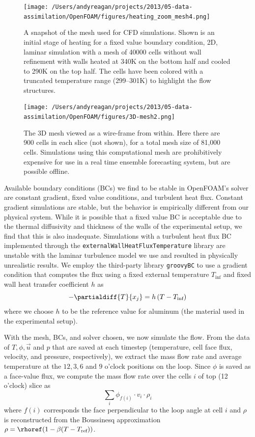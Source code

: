 \begin{figure}[h]
  \centering
  \texttt{[image: /Users/andyreagan/projects/2013/05-data-assimilation/OpenFOAM/figures/heating\_zoom\_mesh4.png]}
  \caption[A snapshot of the mesh used for CFD simulations]{
    A snapshot of the mesh used for CFD simulations.
    Shown is an initial stage of heating for a fixed value boundary condition, 2D, laminar simulation with a mesh of 40000 cells without wall refinement with walls heated at 340K on the bottom half and cooled to 290K on the top half.
    The cells have been colored with a truncated temperature range (299--301K) to highlight the flow structures.
  }
  \label{fig:CFDmesh1}
\end{figure}

\begin{figure}[h]
  \centering
  \texttt{[image: /Users/andyreagan/projects/2013/05-data-assimilation/OpenFOAM/figures/3D-mesh2.png]}
  \caption[The 3D mesh viewed as a wire-frame from within]{
    The 3D mesh viewed as a wire-frame from within.
    Here there are 900 cells in each slice (not shown), for a total mesh size of 81,000 cells.
    Simulations using this computational mesh are prohibitively expensive for use in a real time ensemble forecasting system, but are possible offline.
  }
  \label{fig:CFDmesh2}
\end{figure}

Available boundary conditions (BCs) we find to be stable in OpenFOAM's solver are constant gradient, fixed value conditions, and turbulent heat flux.
Constant gradient simulations are stable, but the behavior is empirically different from our physical system.
While it is possible that a fixed value BC is acceptable due to the thermal diffusivity and thickness of the walls of the experimental setup, we find that this is also inadequate.
Simulations with a turbulent heat flux BC implemented through the \verb|externalWallHeatFluxTemperature| library are unstable with the laminar turbulence model we use and resulted in physically unrealistic results.
We employ the third-party library \verb|groovyBC| to use a gradient condition that computes the flux using a fixed external temperature $T_\text{inf}$ and fixed wall heat transfer coefficient $h$ as $$ - \partialdiff{T}{x_j} = h \left( T-T_\text{inf} \right)$$ where we choose $h$ to be the reference value for aluminum (the material used in the experimental setup).

With the mesh, BCs, and solver chosen, we now simulate the flow.
From the data of $T,\phi,\vec{u}$ and $p$ that are saved at each timestep (temperature, cell face flux, velocity, and pressure, respectively), we extract the mass flow rate and average temperature at the $12,3,6$ and $9$ o'clock positions on the loop.
Since $\phi$ is saved as a face-value flux, we compute the mass flow rate over the cells $i$ of top (12 o'clock) slice as
\begin{equation} \sum _i\phi_{f(i)} \cdot v_i \cdot \rho_i\end{equation}
where $f(i)$ corresponds the face perpendicular to the loop angle at cell $i$ and $\rho$ is reconstructed from the Boussinesq approximation $\rho = \rhoref (1-\beta(T-T_\text{ref}))$.

